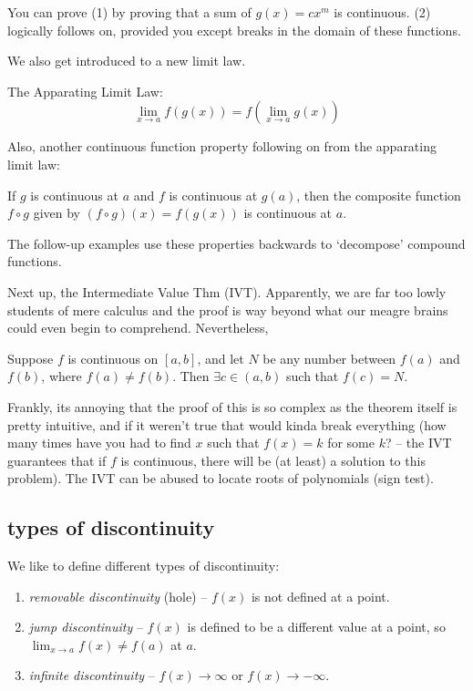 \documentclass[10pt,a4paper]{report}
\begin{document}
You can prove (1) by proving that a sum of $g(x) = cx^m$ is continuous. (2) logically follows on, provided you except breaks in the domain of these functions.

We also get introduced to a new limit law.

The Apparating Limit Law:
$$
	\lim_{x \to a} f(g(x)) = f(\lim_{x \to a} g(x))
$$

Also, another continuous function property following on from the apparating limit law:

If $g$ is continuous at $a$ and $f$ is continuous at $g(a)$, then the composite function $f \circ g$ given by $(f \circ g)(x) = f(g(x))$ is continuous at $a$.

The follow-up examples use these properties backwards to `decompose' compound functions.

Next up, the Intermediate Value Thm (IVT). Apparently, we are far too lowly students of mere calculus and the proof is way beyond what our meagre brains could even begin to comprehend. Nevertheless,

Suppose $f$ is continuous on $[a, b]$, and let $N$ be any number between $f(a)$ and $f(b)$, where $f(a) \ne f(b)$. Then $\exists c \in (a, b)$ such that $f(c) = N$.

Frankly, its annoying that the proof of this is so complex as the theorem itself is pretty intuitive, and if it weren't true that would kinda break everything (how many times have you had to find $x$ such that $f(x) = k$ for some $k$? -- the IVT guarantees that if $f$ is continuous, there will be (at least) a solution to this problem). The IVT can be abused to locate roots of polynomials (sign test).

\subsection{types of discontinuity}

We like to define different types of discontinuity:
\begin{enumerate}
	\item \emph{removable discontinuity} (hole) -- $f(x)$ is not defined at a point.
	\item \emph{jump discontinuity} -- $f(x)$ is defined to be a different value at a point, so $\lim_{x \to a} f(x) \ne f(a)$ at $a$.
	\item \emph{infinite discontinuity} -- $f(x) \to \infty$ or $f(x) \to -\infty$. 
\end{enumerate}
\end{document}
